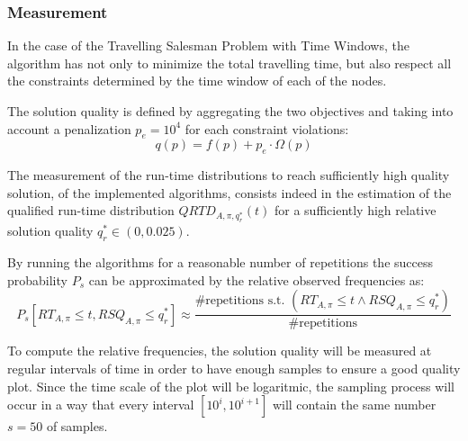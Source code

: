 \subsubsection{Measurement}\label{subsec:measure}
In the case of the Travelling Salesman Problem with Time Windows, the algorithm has not only to minimize the total travelling time, but also respect all the constraints determined by the time window of each of the nodes.

The solution quality is defined by aggregating the two objectives and taking into account a penalization $p_e = 10^4$ for each constraint violations:
\begin{equation}
  q(p) = f(p) + p_e \cdot\Omega(p)
\end{equation}

The measurement of the run-time distributions to reach sufficiently high quality solution, of the implemented algorithms, consists indeed in the estimation of the qualified run-time distribution $QRTD_{A,\pi,q_r^{*}}(t)$ for a sufficiently high relative solution quality $q_r^{*} \in (0,0.025)$.

By running the algorithms for a reasonable number of repetitions the success probability $P_s$ can be approximated by the relative observed frequencies as:
\begin{equation}
P_s[RT_{A,\pi} \le t,RSQ_{A,\pi} \le q_r^{*}] \approx \frac{\text{\#repetitions s.t. } (RT_{A,\pi} \le t \wedge RSQ_{A,\pi} \le q_r^{*})}{\text{\#repetitions}}   
\end{equation}

To compute the relative frequencies, the solution quality will be measured at regular intervals of time in order to have enough samples to ensure a good quality plot.
Since the time scale of the plot will be logaritmic, the sampling process will occur in a way that every interval $[10^i,10^{i+1}]$ will contain the same number $s=50$ of samples.
 



